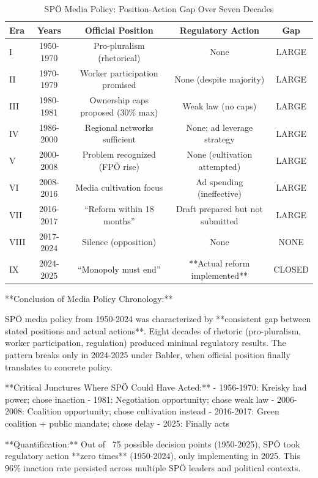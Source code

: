 \begin{table}[h]
\centering
\small
\caption{SPÖ Media Policy: Position-Action Gap Over Seven Decades}
\label{tab:bh-summary-gap}
\begin{tabular}{|l|c|c|c|c|}
\hline
\textbf{Era} & \textbf{Years} & \textbf{Official Position} & \textbf{Regulatory Action} & \textbf{Gap} \\
\hline
I & 1950-1970 & Pro-pluralism (rhetorical) & None & LARGE \\
II & 1970-1979 & Worker participation promised & None (despite majority) & LARGE \\
III & 1980-1981 & Ownership caps proposed (30\% max) & Weak law (no caps) & LARGE \\
IV & 1986-2000 & Regional networks sufficient & None; ad leverage strategy & LARGE \\
V & 2000-2008 & Problem recognized (FPÖ rise) & None (cultivation attempted) & LARGE \\
VI & 2008-2016 & Media cultivation focus & Ad spending (ineffective) & LARGE \\
VII & 2016-2017 & ``Reform within 18 months'' & Draft prepared but not submitted & LARGE \\
VIII & 2017-2024 & Silence (opposition) & None & NONE \\
IX & 2024-2025 & ``Monopoly must end'' & **Actual reform implemented** & CLOSED \\
\hline
\end{tabular}
\end{table}

**Conclusion of Media Policy Chronology:**

SPÖ media policy from 1950-2024 was characterized by **consistent gap between stated positions and actual actions**.
Eight decades of rhetoric (pro-pluralism, worker participation, regulation) produced minimal regulatory results.
The pattern breaks only in 2024-2025 under Babler, when official position finally translates to concrete policy.

**Critical Junctures Where SPÖ Could Have Acted:**
- 1956-1970: Kreisky had power; chose inaction
- 1981: Negotiation opportunity; chose weak law
- 2006-2008: Coalition opportunity; chose cultivation instead
- 2016-2017: Green coalition + public mandate; chose delay
- 2025: Finally acts

**Quantification:** Out of ~75 possible decision points (1950-2025), SPÖ took regulatory action **zero times** (1950-2024),
only implementing in 2025. This 96\% inaction rate persisted across multiple SPÖ leaders and political contexts.

